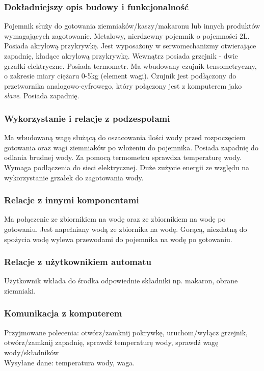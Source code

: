 \documentclass[12pt,a4paper,notitlepage]{report}
\begin{document}
\subsubsection{Dokładniejszy opis budowy i funkcjonalność}
Pojemnik służy do gotowania ziemniaków/kaszy/makaronu lub innych produktów wymagających zagotowanie. Metalowy, nierdzewny pojemnik o pojemności 2L. Posiada akrylową przykrywkę. Jest wyposażony w serwomechanizmy otwierające zapadnię, kładące akrylową przykrywkę. Wewnątrz posiada grzejnik - dwie grzałki elektryczne. Posiada termometr. Ma wbudowany czujnik tensometryczny, o zakresie miary ciężaru 0-5kg (element wagi). Czujnik jest podłączony do przetwornika analogowo-cyfrowego, który połączony jest z komputerem jako \emph{slave}. Posiada zapadnię.
 
\subsubsection{Wykorzystanie i relacje z podzespołami}
Ma wbudowaną wagę służącą do oszacowania ilości wody przed rozpoczęciem gotowania oraz wagi ziemniaków po włożeniu do pojemnika. Posiada zapadnię do odlania brudnej wody. Za pomocą termometru sprawdza temperaturę wody. Wymaga podłączenia do sieci elektrycznej. Duże zużycie energii ze względu na wykorzystanie grzałek do zagotowania wody.

\subsubsection{Relacje z innymi komponentami}
Ma połączenie ze zbiornikiem na wodę oraz ze zbiornikiem na wodę po gotowaniu. Jest napełniany wodą ze zbiornika na wodę. Gorącą, niezdatną do spożycia wodę wylewa przewodami do pojemnika na wodę po gotowaniu.

\subsubsection{Relacje z użytkownikiem automatu}
Użytkownik wkłada do środka odpowiednie składniki np. makaron, obrane ziemniaki.

\subsubsection{Komunikacja z komputerem}
Przyjmowane polecenia: otwórz/zamknij pokrywkę, uruchom/wyłącz grzejnik, otwórz/zamknij zapadnię, sprawdź temperaturę wody, sprawdź wagę wody/składników\\
Wysyłane dane: temperatura wody, waga.
\end{document}
